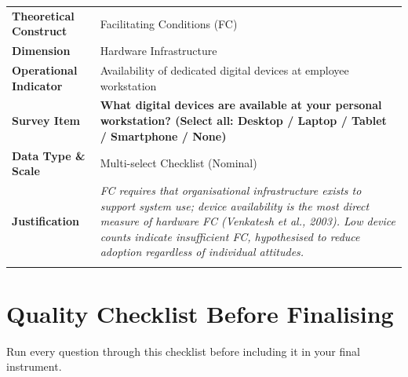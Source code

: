 \documentclass[12pt,a4paper]{article}
\begin{document}
\noindent\begin{tabularx}{\textwidth}{@{}>{\bfseries\small}L{3.2cm}|X@{}}
\hline
Theoretical Construct & Facilitating Conditions (FC) \\
Dimension & Hardware Infrastructure \\
Operational Indicator & Availability of dedicated digital devices at employee workstation \\
\hline
{}\textbf{\color{navy}Survey Item} & \textbf{\color{navy}What digital devices are available at your personal workstation? (Select all: Desktop / Laptop / Tablet / Smartphone / None)} \\
\hline
Data Type \& Scale & Multi-select Checklist (Nominal) \\
Justification & \textit{FC requires that organisational infrastructure exists to support system use; device availability is the most direct measure of hardware FC (Venkatesh et al., 2003). Low device counts indicate insufficient FC, hypothesised to reduce adoption regardless of individual attitudes.} \\
\hline
\end{tabularx}

\newpage

\section{Quality Checklist Before Finalising}

Run every question through this checklist before including it in your final instrument.
\end{document}
